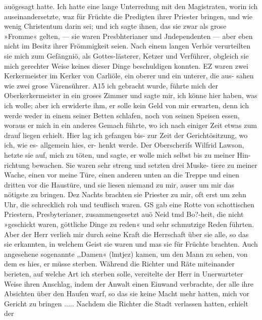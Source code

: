 auögesagt hatte. Ich hatte eine lange Unterredung mit den
Magistraten, worin ich auseinandersetzte, waz für Früchte die
Predigten ihrer Priester bringen, und wie wenig Christentum darin
sei; und ich sagte ihnen, das sie zwar als grose »Fromme«
gelten, — sie waren Presbhterianer und Jndependenten — aber
eben nicht im Besitz ihrer Frömmigkeit seien. Nach einem langen
Verhör verurteilten sie mich zum Gefängniö, als Gottes-lästerer,
Ketzer und Verführer, obgleich sie mich gerechter Weise keines
dieser Dinge beschuldigen konnten. EZ waren zwei Kerkermeister
im Kerker von Carliöle, ein oberer und ein unterer, die aus-
sahen wie zwei grose Värensührer. A15 ich gebracht wurde,
führte mich der Oberkerkermeister in ein groses Zimmer und sagte
mir, ich könne hier haben, was ich wolle; aber ich erwiderte
ihm, er solle kein Geld von mir erwarten, denn ich werde weder
in einem seiner Betten schlafen, noch von seinen Speisen essen,
woraus er mich in ein anderes Gemach führte, wo ich nach einiger
Zeit etwas zum drauf liegen erhielt. Hier lag ich gefangen bis-
zur Zeit der Gerichtösitzung, wo ich, wie es- allgemein hies, er-
henkt werde. Der Oberscherifs Wilfrid Lawson, hetzte sie auf,
mich zu töten, und sagte, er wolle mich selbst bis zu meiner Hin-
richtung bewachen. Sie waren sehr streng und setzten drei Muske-
tiere zu meiner Wache, einen vor meine Türe, einen anderen
unten an die Treppe und einen dritten vor die Haustüre, und
sie liesen niemand zu mir, auser um mir das nötigste zu bringen.
Dez Nachts brachten sie Priester zu mir, oft erst um zehn Uhr,
die schrecklich roh und teuflisch waren. GS gab eine Rotte von
schottischen Priestern, Presbyterianer, zusammengesetzt auö Neid
tmd Bo?-heit, die nicht »geschickt waren, göttliche Dinge zu reden«
und sehr schmutzige Reden führten. Aber der Herr verlieh mir
durch seine Kraft die Herrschaft über sie alle, so das sie erkannten,
in welchem Geist sie waren und mas sie für Früchte brachten.
Auch angesehene sogenannte ,,Damen« (lmtjez) kamen, um den
Mann zu sehen, von dem es hies, er müsse sterben. Während
die Richter und Räte miteinander berieten, auf welche Art ich
sterben solle, vereitelte der Herr in Unerwarteter Weise ihren
Anschlag, indem der Anwalt einen Einwand verbrachte, der
alle ihre Absichten über den Haufen warf, so das sie keine
Macht mehr hatten, mich vor Gericht zu bringen .....
Nachdem die Richter die Stadt verlassen hatten, erhielt der



